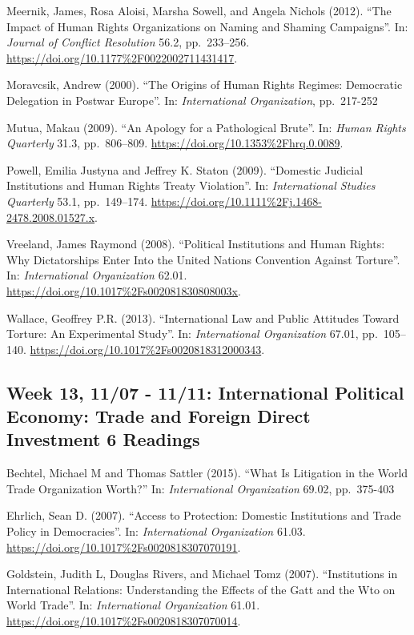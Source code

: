 \documentclass[10pt,]{article}
\begin{document}
Meernik, James, Rosa Aloisi, Marsha Sowell, and Angela Nichols (2012).
``The Impact of Human Rights Organizations on Naming and Shaming
Campaigns''. In: \emph{Journal of Conflict Resolution} 56.2,
pp.~233--256. \url{https://doi.org/10.1177\%2F0022002711431417}.

Moravcsik, Andrew (2000). ``The Origins of Human Rights Regimes:
Democratic Delegation in Postwar Europe''. In:
\emph{International Organization}, pp.~217-252

Mutua, Makau (2009). ``An Apology for a Pathological Brute''. In:
\emph{Human Rights Quarterly} 31.3, pp.~806--809.
\url{https://doi.org/10.1353\%2Fhrq.0.0089}.

Powell, Emilia Justyna and Jeffrey K. Staton (2009). ``Domestic Judicial
Institutions and Human Rights Treaty Violation''. In:
\emph{International Studies Quarterly} 53.1, pp.~149--174.
\url{https://doi.org/10.1111\%2Fj.1468-2478.2008.01527.x}.

Vreeland, James Raymond (2008). ``Political Institutions and Human
Rights: Why Dictatorships Enter Into the United Nations Convention
Against Torture''. In: \emph{International Organization} 62.01.
\url{https://doi.org/10.1017\%2Fs002081830808003x}.

Wallace, Geoffrey P.R. (2013). ``International Law and Public Attitudes
Toward Torture: An Experimental Study''. In:
\emph{International Organization} 67.01, pp.~105--140.
\url{https://doi.org/10.1017\%2Fs0020818312000343}.

\subsection{Week 13, 11/07 - 11/11: International Political Economy:
Trade and Foreign Direct Investment \textbar{} 6
Readings}\label{week-13-1107---1111-international-political-economy-trade-and-foreign-direct-investment-6-readings}

Bechtel, Michael M and Thomas Sattler (2015). ``What Is Litigation in
the World Trade Organization Worth?'' In:
\emph{International Organization} 69.02, pp.~375-403

Ehrlich, Sean D. (2007). ``Access to Protection: Domestic Institutions
and Trade Policy in Democracies''. In: \emph{International Organization}
61.03. \url{https://doi.org/10.1017\%2Fs0020818307070191}.

Goldstein, Judith L, Douglas Rivers, and Michael Tomz (2007).
``Institutions in International Relations: Understanding the Effects of
the Gatt and the Wto on World Trade''. In:
\emph{International Organization} 61.01.
\url{https://doi.org/10.1017\%2Fs0020818307070014}.
\end{document}
